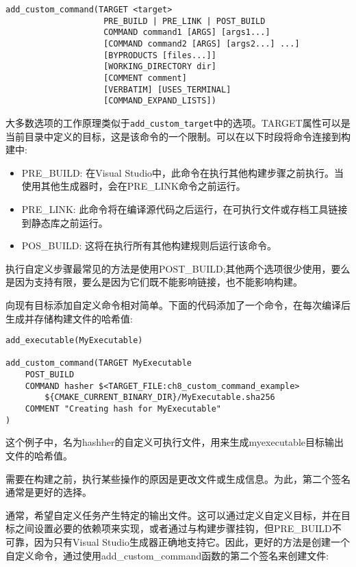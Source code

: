 \begin{lstlisting}[style=styleCMake]
add_custom_command(TARGET <target>
					PRE_BUILD | PRE_LINK | POST_BUILD
					COMMAND command1 [ARGS] [args1...]
					[COMMAND command2 [ARGS] [args2...] ...]
					[BYPRODUCTS [files...]]
					[WORKING_DIRECTORY dir]
					[COMMENT comment]
					[VERBATIM] [USES_TERMINAL]
					[COMMAND_EXPAND_LISTS])
\end{lstlisting}

大多数选项的工作原理类似于\texttt{add\_custom\_target}中的选项。TARGET属性可以是当前目录中定义的目标，这是该命令的一个限制。可以在以下时段将命令连接到构建中:

\begin{itemize}
\item 
PRE\_BUILD: 在Visual Studio中，此命令在执行其他构建步骤之前执行。当使用其他生成器时，会在PRE\_LINK命令之前运行。

\item 
PRE\_LINK: 此命令将在编译源代码之后运行，在可执行文件或存档工具链接到静态库之前运行。

\item 
POS\_BUILD: 这将在执行所有其他构建规则后运行该命令。
\end{itemize}

执行自定义步骤最常见的方法是使用POST\_BUILD;其他两个选项很少使用，要么是因为支持有限，要么是因为它们既不能影响链接，也不能影响构建。

向现有目标添加自定义命令相对简单。下面的代码添加了一个命令，在每次编译后生成并存储构建文件的哈希值:

\begin{lstlisting}[style=styleCMake]
add_executable(MyExecutable)

add_custom_command(TARGET MyExecutable
	POST_BUILD
	COMMAND hasher $<TARGET_FILE:ch8_custom_command_example>
		${CMAKE_CURRENT_BINARY_DIR}/MyExecutable.sha256
	COMMENT "Creating hash for MyExecutable"
)
\end{lstlisting}

这个例子中，名为hashher的自定义可执行文件，用来生成myexecutable目标输出文件的哈希值。

需要在构建之前，执行某些操作的原因是更改文件或生成信息。为此，第二个签名通常是更好的选择。


通常，希望自定义任务产生特定的输出文件。这可以通过定义自定义目标，并在目标之间设置必要的依赖项来实现，或者通过与构建步骤挂钩，但PRE\_BUILD不可靠，因为只有Visual Studio生成器正确地支持它。因此，更好的方法是创建一个自定义命令，通过使用add\_custom\_command函数的第二个签名来创建文件:

